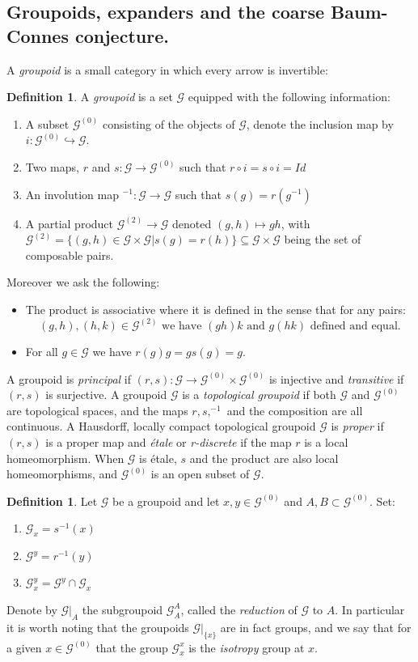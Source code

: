 \documentclass[11pt]{amsart}
\theoremstyle{plain}
\theoremstyle{definition}%
\newtheorem{definition}[theorem]{Definition}%
\theoremstyle{remark}%
\newcommand{\G}{\mathcal{G}}
\begin{document}
\subsection{Groupoids, expanders and the coarse Baum-Connes conjecture.}\label{Sect:GO}
A \textit{groupoid} is a small category in which every arrow is invertible:
\begin{definition}\label{def:grpoid2}
A \textit{groupoid} is a set $\G$ equipped with the following information:
\begin{enumerate}
\item A subset $\G^{(0)}$ consisting of the objects of $\G$, denote the inclusion map by $i: \G^{(0)}\hookrightarrow \G$. 
\item Two maps, $r$ and $s: \G  \rightarrow \G^{(0)}$ such that $r\circ i = s \circ i = Id$ 
\item An involution map $^{-1}:\G \rightarrow \G$ such that $s(g)=r(g^{-1})$
\item A partial product $\G^{(2)} \rightarrow \G$ denoted $(g,h) \mapsto gh$, with $\G^{(2)}=\lbrace (g,h) \in \G \times \G | s(g)=r(h) \rbrace\subseteq \G\times \G$ being the set of composable pairs.
\end{enumerate}
Moreover we ask the following:
\begin{itemize}
\item The product is associative where it is defined in the sense that for any pairs: 
\begin{equation*}
(g,h),(h,k)\in \G^{(2)} \mbox{ we have }(gh)k \mbox{ and } g(hk) \mbox{ defined and equal}.
\end{equation*}
\item For all $g \in \G$ we have $r(g)g=gs(g)=g$.
\end{itemize}
\end{definition}
A groupoid is \textit{principal} if $(r,s): \G \rightarrow \G^{(0)} \times \G^{(0)}$ is injective and \textit{transitive} if $(r,s)$ is surjective. A groupoid $\G$ is a \textit{topological groupoid} if both $\G$ and $\G^{(0)}$ are topological spaces, and the maps $r,s, ^{-1}$ and the composition are all continuous. A Hausdorff, locally compact topological groupoid $\G$ is \textit{proper} if $(r,s)$ is a proper map and \textit{\'etale} or \textit{r-discrete} if the map $r$ is a local homeomorphism. When $\G$ is \'etale, $s$ and the product are also local homeomorphisms, and $\G^{(0)}$ is an open subset of $\G$.

\begin{definition}
Let $\G$ be a groupoid and let $x,y \in \G^{(0)}$ and $A,B \subset \G^{(0)}$. Set:
\begin{enumerate}
\item $\G_{x}=s^{-1}(x)$
\item $\G^{y}=r^{-1}(y)$
\item $\G^{y}_{x}=\G^{y} \cap \G_{x}$
\end{enumerate}
Denote by $\G|_{A}$ the subgroupoid $\G_{A}^{A}$, called the \textit{reduction} of $\G$ to $A$. In particular it is worth noting that the groupoids $\G|_{\lbrace x \rbrace}$ are in fact groups, and we say that for a given $x \in \G^{(0)}$ that the group $\G^{x}_{x}$ is the \textit{isotropy} group at $x$.
\end{definition}
\end{document}
